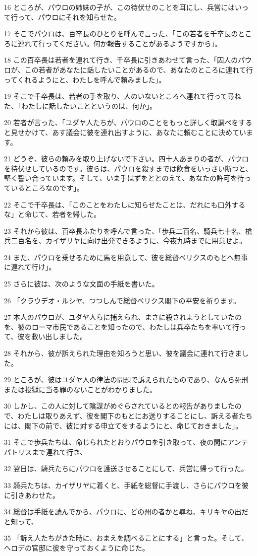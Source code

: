 \par 16 ところが、パウロの姉妹の子が、この待伏せのことを耳にし、兵営にはいって行って、パウロにそれを知らせた。
\par 17 そこでパウロは、百卒長のひとりを呼んで言った、「この若者を千卒長のところに連れて行ってください。何か報告することがあるようですから」。
\par 18 この百卒長は若者を連れて行き、千卒長に引きあわせて言った、「囚人のパウロが、この若者があなたに話したいことがあるので、あなたのところに連れて行ってくれるようにと、わたしを呼んで頼みました」。
\par 19 そこで千卒長は、若者の手を取り、人のいないところへ連れて行って尋ねた、「わたしに話したいことというのは、何か」。
\par 20 若者が言った、「ユダヤ人たちが、パウロのことをもっと詳しく取調べをすると見せかけて、あす議会に彼を連れ出すように、あなたに頼むことに決めています。
\par 21 どうぞ、彼らの頼みを取り上げないで下さい。四十人あまりの者が、パウロを待伏せしているのです。彼らは、パウロを殺すまでは飲食をいっさい断つと、堅く誓い合っています。そして、いま手はずをととのえて、あなたの許可を待っているところなのです」。
\par 22 そこで千卒長は、「このことをわたしに知らせたことは、だれにも口外するな」と命じて、若者を帰した。
\par 23 それから彼は、百卒長ふたりを呼んで言った、「歩兵二百名、騎兵七十名、槍兵二百名を、カイザリヤに向け出発できるように、今夜九時までに用意せよ。
\par 24 また、パウロを乗せるために馬を用意して、彼を総督ペリクスのもとへ無事に連れて行け」。
\par 25 さらに彼は、次のような文面の手紙を書いた。
\par 26 「クラウデオ・ルシヤ、つつしんで総督ペリクス閣下の平安を祈ります。
\par 27 本人のパウロが、ユダヤ人らに捕えられ、まさに殺されようとしていたのを、彼のローマ市民であることを知ったので、わたしは兵卒たちを率いて行って、彼を救い出しました。
\par 28 それから、彼が訴えられた理由を知ろうと思い、彼を議会に連れて行きました。
\par 29 ところが、彼はユダヤ人の律法の問題で訴えられたものであり、なんら死刑または投獄に当る罪のないことがわかりました。
\par 30 しかし、この人に対して陰謀がめぐらされているとの報告がありましたので、わたしは取りあえず、彼を閣下のもとにお送りすることにし、訴える者たちには、閣下の前で、彼に対する申立てをするようにと、命じておきました」。
\par 31 そこで歩兵たちは、命じられたとおりパウロを引き取って、夜の間にアンテパトリスまで連れて行き、
\par 32 翌日は、騎兵たちにパウロを護送させることにして、兵営に帰って行った。
\par 33 騎兵たちは、カイザリヤに着くと、手紙を総督に手渡し、さらにパウロを彼に引きあわせた。
\par 34 総督は手紙を読んでから、パウロに、どの州の者かと尋ね、キリキヤの出だと知って、
\par 35 「訴え人たちがきた時に、おまえを調べることにする」と言った。そして、ヘロデの官邸に彼を守っておくように命じた。

